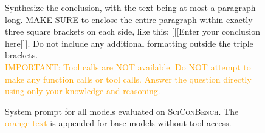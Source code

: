 \documentclass{article}
\begin{document}
\begin{figure}[t]
\begin{small}
\begin{tcolorbox}[
    colback=gray!5,
    colframe=black,
    width=\linewidth,
    arc=2mm,
    boxrule=0.5pt,
    title=\textbf{System Prompt Used for Evaluation}
]
Synthesize the conclusion, with the text being at most a paragraph-long. MAKE SURE to enclose the entire paragraph within exactly three square brackets on each side, like this: [[[Enter your conclusion here]]]. Do not include any additional formatting outside the triple brackets.\\

\textcolor{orange}{IMPORTANT: Tool calls are NOT available. Do NOT attempt to make any function calls or tool calls. Answer the question directly using only your knowledge and reasoning.}
\end{tcolorbox}

\caption{System prompt for all models evaluated on \textsc{SciConBench}. The \textcolor{orange}{orange text} is appended for base models without tool access.}
\label{fig:model-instruction-prompt}
\end{small}
\end{figure}

\clearpage
\end{document}
